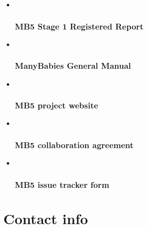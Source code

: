 \documentclass[
]{book}
\begin{document}
\begin{itemize}
\item ~
  \subsubsection*{MB5 Stage 1 Registered Report}\label{mb5-stage-1-registered-report}
\item ~
  \subsubsection*{ManyBabies General Manual}\label{manybabies-general-manual}
\item ~
  \subsubsection*{MB5 project website}\label{mb5-project-website}
\item ~
  \subsubsection*{MB5 collaboration agreement}\label{mb5-collaboration-agreement}
\item ~
  \subsubsection{MB5 issue tracker form}\label{mb5-issue-tracker-form}
\end{itemize}

\section*{Contact info}\label{contact-info}
\end{document}
